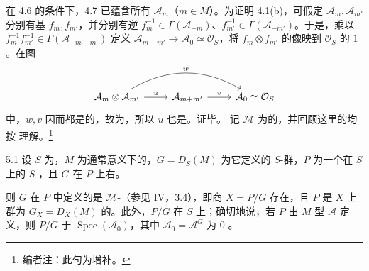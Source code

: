 在 4.6 的条件下，4.7 已蕴含所有 $\mathcal A_m$（$m\in M$）。为证明 4.1(b)，可假定 $\mathcal A_m,\mathcal A_{m'}$ 分别有基 $f_m,f_{m'}$，并分别有逆 $f_m^{-1}\in\Gamma(\mathcal A_{-m})$、$f_{m'}^{-1}\in\Gamma(\mathcal A_{-m'})$。于是，乘以 $f_m^{-1}f_{m'}^{-1}\in\Gamma(\mathcal A_{-m-m'})$ 定义 $\mathcal A_{m+m'}\to\mathcal A_0\simeq\mathcal O_S$，将 $f_m\otimes f_{m'}$ 的像映到 $\mathcal O_S$ 的 $1$。在图
\[
\begin{tikzcd}
\mathcal A_m\otimes\mathcal A_{m'}\arrow[r,"u"]\arrow[rr,bend left=30,"w"]&\mathcal A_{m+m'}\arrow[r,"v"]&\mathcal A_0\simeq\mathcal O_S
\end{tikzcd}
\]
中，$w,v$ 因而都是的，故为，所以 $u$ 也是。证毕。
记 $\mathcal M$ 为的，并回顾这里的均按 理解。\footnote[17]{编者注：此句为增补。}
\begin{SGAresult}{}{5.1}
设 $S$ 为，$M$ 为通常意义下的，$G=D_S(M)$ 为它定义的 $S$-群，$P$ 为一个在 $S$ 上的 $S$-，且 $G$ 在 $P$ 上右。

则 $G$ 在 $P$ 中定义的是 $\mathcal M$-（参见 IV，3.4），即商 $X=P/G$ 存在，且 $P$ 是 $X$ 上群为 $G_X=D_X(M)$ 的。此外，$P/G$ 在 $S$ 上；确切地说，若 $P$ 由 $M$ 型 $\mathcal A$ 定义，则 $P/G$ 于 $\operatorname{Spec}(\mathcal A_0)$，其中 $\mathcal A_0=\mathcal A^G$ 为 $0$ 。
\end{SGAresult}
